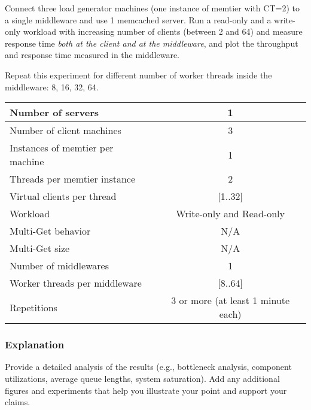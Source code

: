 \documentclass[11pt,a4paper]{article}
\begin{document}
Connect three load generator machines (one instance of memtier with CT=2) to a single middleware and use 1 memcached server. Run a read-only and a write-only workload with increasing number of clients (between 2 and 64) and measure response time \emph{both at the client and at the middleware}, and plot the throughput and response time measured in the middleware.

Repeat this experiment for different number of worker threads inside the middleware: 8, 16, 32, 64.

\begin{center}
	\scriptsize{
		\begin{tabular}{|l|c|}
			\hline Number of servers                & 1                        \\ 
			\hline Number of client machines        & 3                        \\ 
			\hline Instances of memtier per machine & 1                        \\ 
			\hline Threads per memtier instance     & 2                        \\
			\hline Virtual clients per thread       & [1..32]                  \\ 
			\hline Workload                         & Write-only and Read-only \\
			\hline Multi-Get behavior               & N/A                      \\
			\hline Multi-Get size                   & N/A                      \\
			\hline Number of middlewares            & 1                        \\
			\hline Worker threads per middleware    & [8..64]                  \\
			\hline Repetitions                      & 3 or more (at least 1 minute each)                \\ 
			\hline 
		\end{tabular}
	} 
\end{center}

\subsubsection{Explanation}

Provide a detailed analysis of the results (e.g., bottleneck analysis, component utilizations, average queue lengths, system saturation). Add any additional figures and experiments that help you illustrate your point and support your claims.
\end{document}
